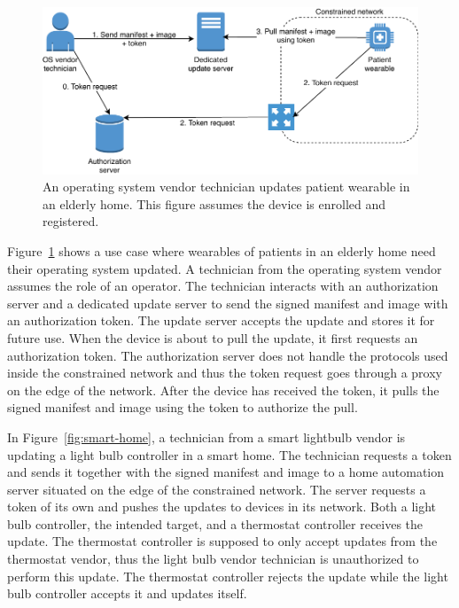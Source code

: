 \documentclass[0-thesis.tex]{subfiles}
\begin{document}
\begin{figure}[t]
    \caption[An operating system vendor technician updates patient wearable in an elderly home.]
        {An operating system vendor technician updates patient wearable in an elderly home. This figure assumes the device is enrolled and registered.}
    \label{fig:elderly-home}
    \includegraphics{images/use-case-elderly-home.pdf}
\end{figure}

Figure~\ref{fig:elderly-home} shows a use case where wearables of patients in an elderly
home need their operating system updated. A technician from the operating system vendor
assumes the role of an operator. The technician interacts with an authorization server and
a dedicated update server to send the signed manifest and image with an authorization
token. The update server accepts the update and stores it for future use. When the device
is about to pull the update, it first requests an authorization token. The authorization
server does not handle the protocols used inside the constrained network and thus the
token request goes through a proxy on the edge of the network. After the device has
received the token, it pulls the signed manifest and image using the token to authorize
the pull.

In Figure~\ref{fig:smart-home}, a technician from a smart lightbulb vendor is updating a
light bulb controller in a smart home. The technician requests a token and sends it
together with the signed manifest and image to a home automation server situated on the
edge of the constrained network. The server requests a token of its own and pushes the
updates to devices in its network. Both a light bulb controller, the intended target, and
a thermostat controller receives the update. The thermostat controller is supposed to only
accept updates from the thermostat vendor, thus the light bulb vendor technician is
unauthorized to perform this update. The thermostat controller rejects the update while
the light bulb controller accepts it and updates itself.
\end{document}
